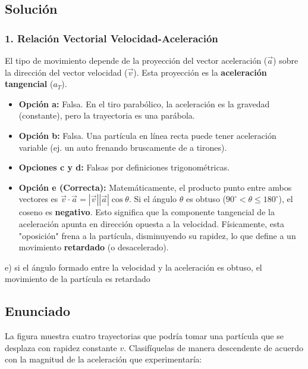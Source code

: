 \documentclass[12pt, a4paper]{article}
\begin{document}
\subsection*{Solución}

\subsubsection*{1. Relación Vectorial Velocidad-Aceleración}
El tipo de movimiento depende de la proyección del vector aceleración ($\vec{a}$) sobre la dirección del vector velocidad ($\vec{v}$). Esta proyección es la \textbf{aceleración tangencial} ($a_T$).

\begin{itemize}
    \item \textbf{Opción a:} Falsa. En el tiro parabólico, la aceleración es la gravedad (constante), pero la trayectoria es una parábola.
    \item \textbf{Opción b:} Falsa. Una partícula en línea recta puede tener aceleración variable (ej. un auto frenando bruscamente de a tirones).
    \item \textbf{Opciones c y d:} Falsas por definiciones trigonométricas.
    \item \textbf{Opción e (Correcta):} Matemáticamente, el producto punto entre ambos vectores es $\vec{v} \cdot \vec{a} = |\vec{v}||\vec{a}|\cos\theta$. Si el ángulo $\theta$ es obtuso ($90^\circ < \theta \le 180^\circ$), el coseno es \textbf{negativo}. Esto significa que la componente tangencial de la aceleración apunta en dirección opuesta a la velocidad. Físicamente, esta "oposición" frena a la partícula, disminuyendo su rapidez, lo que define a un movimiento \textbf{retardado} (o desacelerado).
\end{itemize}

\begin{tcolorbox}[colback=green!5!white, colframe=green!50!black, title=Respuesta Final]
\centering \Large e) si el ángulo formado entre la velocidad y la aceleración es obtuso, el movimiento de la partícula es retardado
\end{tcolorbox}

\newpage

\subsection*{Enunciado}
La figura muestra cuatro trayectorias que podría tomar una partícula que se desplaza con rapidez constante $v$. Clasifíquelas de manera descendente de acuerdo con la magnitud de la aceleración que experimentaría:
\end{document}
